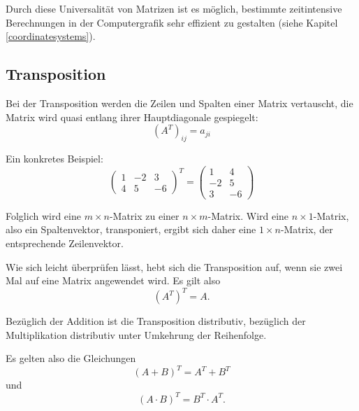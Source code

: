 Durch diese Universalität von Matrizen ist es möglich, bestimmte zeitintensive Berechnungen in der Computergrafik sehr effizient zu gestalten (siehe Kapitel \ref{coordinatesystems}).

\subsection{Transposition}
\label{transposition}
Bei der Transposition werden die Zeilen und Spalten einer Matrix vertauscht, die Matrix wird quasi entlang ihrer Hauptdiagonale gespiegelt:
\begin{equation}
 (A^T)_{ij} = a_{ji}
\end{equation} 

Ein konkretes Beispiel:
\begin{equation}
  \begin{pmatrix}
    1 & -2 & 3 \\
    4 & 5 & -6
  \end{pmatrix}^T
  =
  \begin{pmatrix}
    1 & 4 \\
    -2 & 5 \\
    3 & -6
  \end{pmatrix}
\end{equation}

Folglich wird eine $m \times n$-Matrix zu einer $n \times m$-Matrix. Wird eine $n \times 1$-Matrix, also ein Spaltenvektor, transponiert, ergibt sich daher eine $1 \times n$-Matrix, der entsprechende Zeilenvektor.

Wie sich leicht überprüfen lässt, hebt sich die Transposition auf, wenn sie zwei Mal auf eine Matrix angewendet wird. Es gilt also
\begin{equation}
 (A^T)^T = A.
\end{equation}

Bezüglich der Addition ist die Transposition distributiv, bezüglich der Multiplikation distributiv unter Umkehrung der Reihenfolge. 

Es gelten also die Gleichungen
\begin{equation}
 (A + B)^T = A^T + B^T
\end{equation}
und
\begin{equation}
\label{transpositionmultiplication}
 (A \cdot B)^T = B^T \cdot A^T.
\end{equation}


